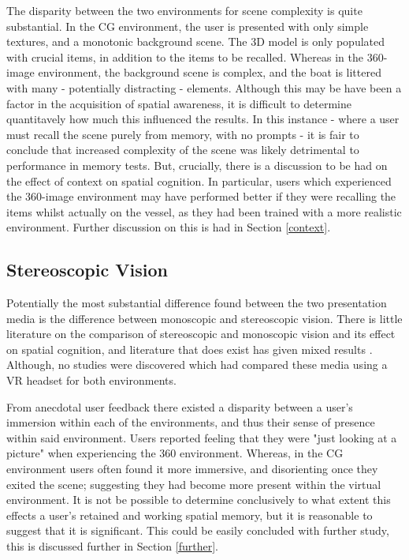 \documentclass[ %
                    author={Elis Jones},
                supervisor={Dr. Kirsten Cater},
                    degree={BSc},
                     title={The Effect of Presentation Medium on Spatial Cognition},
                  subtitle={in the Virtual Environment},
                      year={2018} ]{dissertation}
\begin{document}
The disparity between the two environments for scene complexity is quite substantial. In the CG environment, the user is presented with only simple textures, and a monotonic background scene. The 3D model is only populated with crucial items, in addition to the items to be recalled. Whereas in the 360-image environment, the background scene is complex, and the boat is littered with many - potentially distracting - elements. Although this may be have been a factor in the acquisition of spatial awareness, it is difficult to determine quantitavely how much this influenced the results. In this instance - where a user must recall the scene purely from memory, with no prompts - it is fair to conclude that increased complexity of the scene was likely detrimental to performance in memory tests. But, crucially, there is a discussion to be had on the effect of context on spatial cognition. In particular, users which experienced the 360-image environment may have performed better if they were recalling the items whilst actually on the vessel, as they had been trained with a more realistic environment. Further discussion on this is had in Section \ref{context}.

\subsection{Stereoscopic Vision}\label{stereo}
Potentially the most substantial difference found between the two presentation media is the difference between monoscopic and stereoscopic vision. There is little literature on the comparison of stereoscopic and monoscopic vision and its effect on spatial cognition, and literature that does exist has given mixed results \citep{price}. Although, no studies were discovered which had compared these media using a VR headset for both environments. 

From anecdotal user feedback there existed a disparity between a user's immersion within each of the environments, and thus their sense of presence within said environment. Users reported feeling that they were "just looking at a picture" when experiencing the 360 environment. Whereas, in the CG environment users often found it more immersive, and disorienting once they exited the scene; suggesting they had become more present within the virtual environment. It is not be possible to determine conclusively to what extent this effects a user's retained and working spatial memory, but it is reasonable to suggest that it is significant. This could be easily concluded with further study, this is discussed further in Section \ref{further}. 
\end{document}
